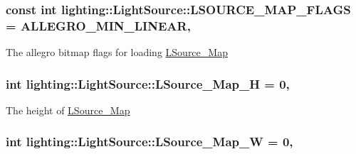 \subsubsection[{\texorpdfstring{L\+S\+O\+U\+R\+C\+E\+\_\+\+M\+A\+P\+\_\+\+F\+L\+A\+GS}{LSOURCE_MAP_FLAGS}}]{\setlength{\rightskip}{0pt plus 5cm}const int lighting\+::\+Light\+Source\+::\+L\+S\+O\+U\+R\+C\+E\+\_\+\+M\+A\+P\+\_\+\+F\+L\+A\+GS = A\+L\+L\+E\+G\+R\+O\+\_\+\+M\+I\+N\+\_\+\+L\+I\+N\+E\+AR\hspace{0.3cm}{\ttfamily [static]}, {\ttfamily [protected]}}\hypertarget{classlighting_1_1LightSource_a596474efbeedef2777aeb01e33d845f5}{}\label{classlighting_1_1LightSource_a596474efbeedef2777aeb01e33d845f5}


The allegro bitmap flags for loading \hyperlink{classlighting_1_1LightSource_a11a9e08c80631c3019c2a59947c8458e}{L\+Source\+\_\+\+Map} 

\subsubsection[{\texorpdfstring{L\+Source\+\_\+\+Map\+\_\+H}{LSource_Map_H}}]{\setlength{\rightskip}{0pt plus 5cm}int lighting\+::\+Light\+Source\+::\+L\+Source\+\_\+\+Map\+\_\+H = 0\hspace{0.3cm}{\ttfamily [static]}, {\ttfamily [protected]}}\hypertarget{classlighting_1_1LightSource_aff96d0ce927829938fe4ed0b07d95448}{}\label{classlighting_1_1LightSource_aff96d0ce927829938fe4ed0b07d95448}


The height of \hyperlink{classlighting_1_1LightSource_a11a9e08c80631c3019c2a59947c8458e}{L\+Source\+\_\+\+Map} 

\subsubsection[{\texorpdfstring{L\+Source\+\_\+\+Map\+\_\+W}{LSource_Map_W}}]{\setlength{\rightskip}{0pt plus 5cm}int lighting\+::\+Light\+Source\+::\+L\+Source\+\_\+\+Map\+\_\+W = 0\hspace{0.3cm}{\ttfamily [static]}, {\ttfamily [protected]}}\hypertarget{classlighting_1_1LightSource_a0f364dedbf71ae79f11d1b05fe2863dd}{}\label{classlighting_1_1LightSource_a0f364dedbf71ae79f11d1b05fe2863dd}


